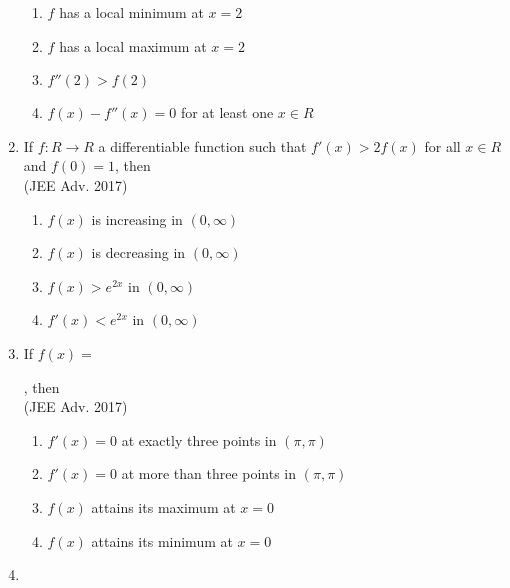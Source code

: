 \documentclass[journal,12pt,twocolumn]{IEEEtran}
\theoremstyle{remark}
\begin{document}
\begin{enumerate}
{            \begin{enumerate}
                \item $f$ has a local minimum at $x=2$
                \item $f$ has a local maximum at $x=2$
                \item $f''(2)>f(2)$
                \item $f(x) - f''(x) = 0$ for at least one $x\in R$
            \end{enumerate}
        
        }
    \item{
        
            If $f: R\rightarrow R$ a differentiable function such that $f'(x)>2f(x)$ for all $x \in R$ and $f(0) = 1$, then
            \\ \text{   } \hfill
                {(JEE Adv. 2017)}
            
            \begin{enumerate}
                \item $f(x)$ is increasing in $(0,\infty)$
                \item $f(x)$ is decreasing in $(0,\infty)$
                \item $f(x)>e^{2x}$ in $(0,\infty)$
                \item $f'(x)<e^{2x}$ in $(0,\infty)$
            \end{enumerate}
        
        }
    \item{
        
            If $f(x) = $
            
            , then
            \\ \text{   } \hfill
                {(JEE Adv. 2017)}
            
            \begin{enumerate}
                \item $f'(x) = 0$ at exactly three points in $(\pi,\pi)$
                \item $f'(x) = 0$ at more than three points in $(\pi,\pi)$
                \item $f(x)$ attains its maximum at $x=0$
                \item $f(x)$ attains its minimum at $x=0$
            \end{enumerate}
        
        }
    \item{
        
}
\end{enumerate}
\end{document}
